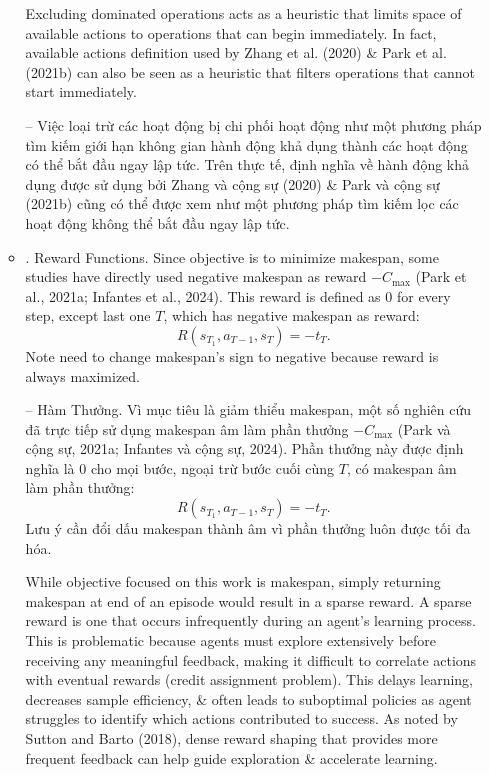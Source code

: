 \documentclass{article}
\begin{document}
\begin{itemize}
\begin{itemize}
        Excluding dominated operations acts as a heuristic that limits space of available actions to operations that can begin immediately. In fact, available actions definition used by Zhang et al. (2020) \& Park et al. (2021b) can also be seen as a heuristic that filters operations that cannot start immediately.

        -- Việc loại trừ các hoạt động bị chi phối hoạt động như một phương pháp tìm kiếm giới hạn không gian hành động khả dụng thành các hoạt động có thể bắt đầu ngay lập tức. Trên thực tế, định nghĩa về hành động khả dụng được sử dụng bởi Zhang và cộng sự (2020) \& Park và cộng sự (2021b) cũng có thể được xem như một phương pháp tìm kiếm lọc các hoạt động không thể bắt đầu ngay lập tức.
        \item {. Reward Functions.} Since objective is to minimize makespan, some studies have directly used negative makespan as reward $-C_{\max}$ (Park et al., 2021a; Infantes et al., 2024). This reward is defined as 0 for every step, except last one $T$, which has negative makespan as reward:
        \begin{equation*}
            R(s_{T_1},a_{T-1},s_T) = -t_T.
        \end{equation*}
        Note need to change makespan's sign to negative because reward is always maximized.

        -- {\sf Hàm Thưởng.} Vì mục tiêu là giảm thiểu makespan, một số nghiên cứu đã trực tiếp sử dụng makespan âm làm phần thưởng $-C_{\max}$ (Park và cộng sự, 2021a; Infantes và cộng sự, 2024). Phần thưởng này được định nghĩa là 0 cho mọi bước, ngoại trừ bước cuối cùng $T$, có makespan âm làm phần thưởng:
        \begin{equation*}
            R(s_{T_1},a_{T-1},s_T) = -t_T.
        \end{equation*}
        Lưu ý cần đổi dấu makespan thành âm vì phần thưởng luôn được tối đa hóa.

        While objective focused on this work is makespan, simply returning makespan at end of an episode would result in a sparse reward. A sparse reward is one that occurs infrequently during an agent's learning process. This is problematic because agents must explore extensively before receiving any meaningful feedback, making it difficult to correlate actions with eventual rewards (credit assignment problem). This delays learning, decreases sample efficiency, \& often leads to suboptimal policies as agent struggles to identify which actions contributed to success. As noted by Sutton and Barto (2018), dense reward shaping that provides more frequent feedback can help guide exploration \& accelerate learning.


\end{itemize}
\end{itemize}
\end{document}
